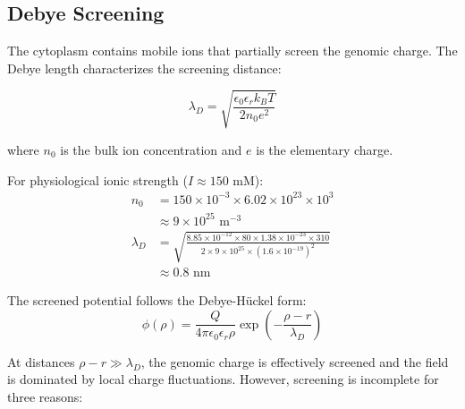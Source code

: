 \documentclass[twocolumn,10pt,aps,prd,superscriptaddress,floatfix,nofootinbib]{revtex4-2}
\theoremstyle{remark}
\begin{document}
\subsection{Debye Screening}
\label{subsec:screening}

The cytoplasm contains mobile ions that partially screen the genomic charge. The Debye length characterizes the screening distance:

\begin{equation}
\lambda_D = \sqrt{\frac{\epsilon_0\epsilon_r k_B T}{2 n_0 e^2}}
\label{eq:debye}
\end{equation}

where $n_0$ is the bulk ion concentration and $e$ is the elementary charge.

For physiological ionic strength ($I \approx 150$ mM):
\begin{align}
n_0 &= 150 \times 10^{-3} \times 6.02 \times 10^{23} \times 10^{3} \nonumber \\
&\approx 9 \times 10^{25} \text{ m}^{-3} \\
\lambda_D &= \sqrt{\frac{8.85 \times 10^{-12} \times 80 \times 1.38 \times 10^{-23} \times 310}{2 \times 9 \times 10^{25} \times (1.6 \times 10^{-19})^2}} \nonumber \\
&\approx 0.8 \text{ nm}
\end{align}

The screened potential follows the Debye-H\"{u}ckel form:
\begin{equation}
\phi(\rho) = \frac{Q}{4\pi\epsilon_0\epsilon_r\rho} \exp\left(-\frac{\rho - r}{\lambda_D}\right)
\label{eq:screened_potential}
\end{equation}

At distances $\rho - r \gg \lambda_D$, the genomic charge is effectively screened and the field is dominated by local charge fluctuations. However, screening is incomplete for three reasons:
\end{document}
